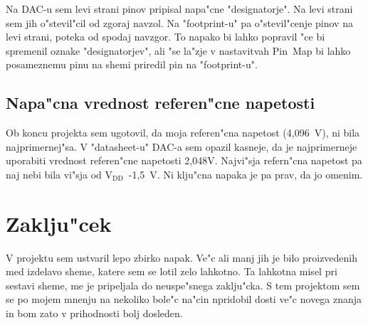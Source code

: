 \documentclass[a4paper]{article}
\begin{document}
Na DAC-u sem levi strani pinov pripisal napa"cne "designatorje". Na levi strani sem jih o"stevil"cil od zgoraj navzol. Na "footprint-u" pa o"stevil"cenje pinov na levi strani,  poteka od spodaj navzgor. To napako bi lahko popravil "ce bi spremenil oznake "designatorjev", ali "se la"zje v nastavitvah Pin~Map bi lahko posameznemu pinu na shemi priredil pin na "footprint-u".

\subsection{Napa"cna vrednost referen"cne napetosti}

Ob koncu projekta sem ugotovil, da moja referen"cna napetost (4,096~V), ni bila najprimernej"sa. V "\mbox{datasheet-u}" DAC-a sem opazil kasneje, da je najprimerneje uporabiti vrednost referen"cne napetosti 2,048V. Najvi"sja refern"cna napetost pa naj nebi bila vi"sja od $\mathrm{V_{DD}}$~-1,5~V. Ni klju"cna napaka je pa prav, da jo omenim.
	
	
\section{Zaklju"cek}


	V projektu sem ustvaril lepo zbirko napak. Ve"c ali manj jih je bilo proizvedenih med izdelavo sheme, katere sem se lotil zelo lahkotno. Ta lahkotna misel pri sestavi sheme, me je pripeljala do neuspe"snega zaklju"cka. S tem projektom sem se po mojem mnenju na nekoliko bole"c na"cin npridobil dosti ve"c novega znanja in bom zato v prihodnosti bolj dosleden. 
\newpage

\pagestyle{empty}
	
	
	
	
\newpage
\pagestyle{fancy}
\end{document}
